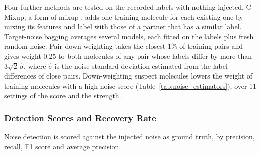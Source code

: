 Four further methods are tested on the recorded labels with nothing injected. C-Mixup, a form of mixup \citep{Zhang2018mixup}, adds one training molecule for each existing one by mixing its features and label with those of a partner that has a similar label. Target-noise bagging averages several models, each fitted on the labels plus fresh random noise. Pair down-weighting takes the closest 1\% of training pairs and gives weight 0.25 to both molecules of any pair whose labels differ by more than $3\sqrt{2}\,\hat\sigma$, where $\hat\sigma$ is the noise standard deviation estimated from the label differences of close pairs. Down-weighting suspect molecules lowers the weight of training molecules with a high noise score (Table~\ref{tab:noise_estimators}), over 11 settings of the score and the strength.

\subsubsection{Detection Scores and Recovery Rate}

Noise detection is scored against the injected noise as ground truth, by precision, recall, F1 score and average precision.

